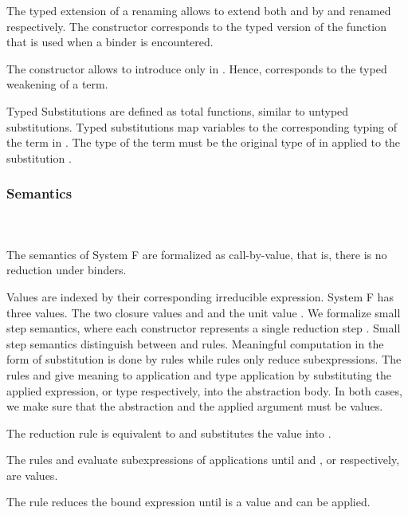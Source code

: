 \noindent The typed extension of a renaming  allows to extend both  and  by  and renamed  respectively. 
The constructor  corresponds to the typed version of the function  that is used when a binder is encountered. 

\noindent The constructor  allows to introduce  only in . 
Hence,  corresponds to the typed weakening of a term.

\noindent Typed Substitutions are defined as total functions, similar to untyped substitutions.
\FSubTyping
Typed substitutions  map variables    to the corresponding typing of the term  in . 
The type of the term  must be the original type of  in  applied to the substitution .
\subsubsection{Semantics}\hfill\\\\
The semantics of System F are formalized as call-by-value, that is, there is no reduction under binders. 

\noindent Values are indexed by their corresponding irreducible expression.
\FVal
System F has three values. 
The two closure values  and  and the unit value .
We formalize small step semantics, where each constructor represents a single reduction step   .
Small step semantics distinguish between  and  rules. 
Meaningful computation in the form of substitution is done by  rules while  rules only reduce subexpressions.
\FSemantics
The rules  and  give meaning to application and type application by substituting the applied expression, or type respectively, into the abstraction body. 
In both cases, we make sure that the abstraction and the applied argument must be values.

\noindent The reduction rule  is equivalent to  and substitutes the value  into . 

\noindent The rules  and  evaluate subexpressions of applications until  and , or  respectively, are values. 

\noindent The rule  reduces the bound expression  until  is a value and  can be applied. 

